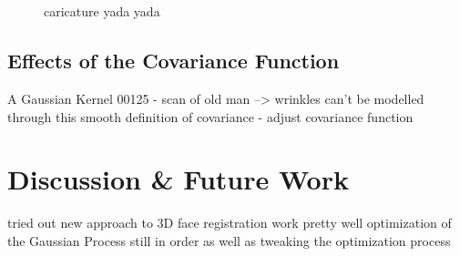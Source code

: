 \begin{figure}[h!]
    \centering
    \\
    \\
   \caption{caricature yada yada}
\label{fig:00303_caricature}
\end{figure}

\subsection{Effects of the Covariance Function}
A Gaussian Kernel
00125 - scan of old man --> wrinkles can't be modelled through this smooth definition of covariance - adjust covariance function
\section{Discussion \& Future Work}
tried out new approach to 3D face registration
work pretty well
optimization of the Gaussian Process still in order
as well as tweaking the optimization process 
